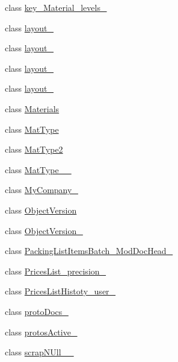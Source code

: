 \begin{DoxyCompactItemize}
\item 
class \mbox{\hyperlink{class_h_k_supply_1_1_migrations_1_1key___material__levels__01}{key\+\_\+\+Material\+\_\+levels\+\_}}
\item 
class \mbox{\hyperlink{class_h_k_supply_1_1_migrations_1_1layout__01}{layout\+\_}}
\item 
class \mbox{\hyperlink{class_h_k_supply_1_1_migrations_1_1layout__02}{layout\+\_}}
\item 
class \mbox{\hyperlink{class_h_k_supply_1_1_migrations_1_1layout__03}{layout\+\_}}
\item 
class \mbox{\hyperlink{class_h_k_supply_1_1_migrations_1_1layout__04}{layout\+\_}}
\item 
class \mbox{\hyperlink{class_h_k_supply_1_1_migrations_1_1_materials}{Materials}}
\item 
class \mbox{\hyperlink{class_h_k_supply_1_1_migrations_1_1_mat_type}{Mat\+Type}}
\item 
class \mbox{\hyperlink{class_h_k_supply_1_1_migrations_1_1_mat_type2}{Mat\+Type2}}
\item 
class \mbox{\hyperlink{class_h_k_supply_1_1_migrations_1_1_mat_type__20170524__01}{Mat\+Type\+\_\+\_}}
\item 
class \mbox{\hyperlink{class_h_k_supply_1_1_migrations_1_1_my_company__01}{My\+Company\+\_}}
\item 
class \mbox{\hyperlink{class_h_k_supply_1_1_migrations_1_1_object_version}{Object\+Version}}
\item 
class \mbox{\hyperlink{class_h_k_supply_1_1_migrations_1_1_object_version__2}{Object\+Version\+\_}}
\item 
class \mbox{\hyperlink{class_h_k_supply_1_1_migrations_1_1_packing_list_items_batch___mod_doc_head__01}{Packing\+List\+Items\+Batch\+\_\+\+Mod\+Doc\+Head\+\_}}
\item 
class \mbox{\hyperlink{class_h_k_supply_1_1_migrations_1_1_prices_list__precision__1}{Prices\+List\+\_\+precision\+\_}}
\item 
class \mbox{\hyperlink{class_h_k_supply_1_1_migrations_1_1_prices_list_histoty__user__1}{Prices\+List\+Histoty\+\_\+user\+\_}}
\item 
class \mbox{\hyperlink{class_h_k_supply_1_1_migrations_1_1proto_docs__01}{proto\+Docs\+\_}}
\item 
class \mbox{\hyperlink{class_h_k_supply_1_1_migrations_1_1protos_active__01}{protos\+Active\+\_}}
\item 
class \mbox{\hyperlink{class_h_k_supply_1_1_migrations_1_1scrap_n_ull__20170612__01}{scrap\+N\+Ull\+\_\+\_}}

\end{DoxyCompactItemize}
